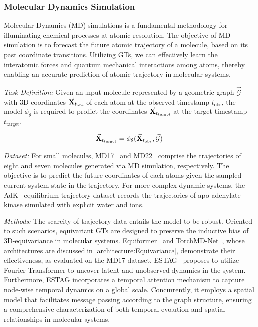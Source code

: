 \subsubsection{\textbf{Molecular Dynamics Simulation}}
Molecular Dynamics (MD) simulations is a fundamental methodology for illuminating chemical processes at atomic resolution.   
The objective of MD simulation is to forecast the future atomic trajectory of a molecule, based on its past coordinate transitions. 
Utilizing GTs, we can effectively learn the %
interatomic forces and quantum mechanical interactions 
among atoms, thereby enabling an accurate prediction of atomic trajectory in molecular systems.


\textit{Task Definition:}
Given an input molecule represented by a geometric graph $\mathcal{\vec{G}}$ with 3D coordinates $\vec{\mathbf{X}}_{t_{\text{obs}}}$ of each atom at the observed timestamp $t_{\text{obs}}$, the model $\phi_{\theta}$ is required to predict the coordinates $\vec{\mathbf{X}}_{t_{\text{target}}}$ at the target timestamp $t_{\text{target}}$.

\begin{equation}
    \vec{\mathbf{X}}_{t_\text{target}} = \phi_\theta(\vec{\mathbf{X}}_{t_\text{obs}}, \mathcal{\vec{G}})
\end{equation}

\textit{Dataset:}
For small molecules, MD17~\cite{chmiela2017machine} and MD22~\cite{chmiela2023accurate} comprise the trajectories of eight and seven molecules generated via MD simulation, respectively. The objective is to predict the future coordinates of each atoms given the sampled current system state in the trajectory. For more complex  dynamic systems, the AdK~\cite{seyler2017molecular} equilibrium trajectory dataset records the trajectories of apo adenylate kinase simulated with explicit water and ions.

\textit{Methods:}
The scarcity of trajectory data entails the model to be robust. 
Oriented to such scenarios, equivariant GTs are designed to preserve the inductive bias of 3D-equivariance in molecular systems.
Equiformer~\cite{liao2023equiformer} and TorchMD-Net~\cite{tholke2022torchmd}, whose architectures are discussed in \cref{architecture:Equivariance}, demonstrate their effectiveness, as evaluated on the MD17 dataset. ESTAG~\cite{wu2024equivariant} proposes to utilize Fourier Transformer to uncover latent and unobserved dynamics in the system. Furthermore, ESTAG incorporates a temporal attention mechanism to capture node-wise temporal dynamics on a global scale. Concurrently, it employs a spatial model that facilitates message passing according to the graph structure, ensuring a comprehensive characterization of both temporal evolution and spatial relationships in molecular systems. 

